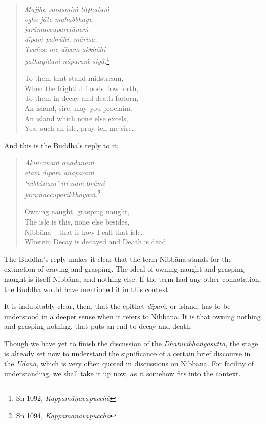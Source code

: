 \begin{quote}
\emph{Majjhe sarasmiṁ tiṭṭhataṁ}\\
\emph{oghe jāte mahabbhaye}\\
\emph{jarāmaccuparetānaṁ}\\
\emph{dīpaṁ pabrūhi, mārisa.}\\
\emph{Tvañca me dīpam akkhāhi}\\
\emph{yathayidaṁ nāparaṁ siyā.}\footnote{Sn 1092, \emph{Kappamāṇavapucchā}}

To them that stand midstream,\\
When the frightful floods flow forth,\\
To them in decay and death forlorn,\\
An island, sire, may you proclaim.\\
An island which none else excels,\\
Yea, such an isle, pray tell me sire.
\end{quote}

\clearpage

And this is the Buddha's reply to it:

\begin{quote}
\emph{Akiñcanaṁ anādānaṁ}\\
\emph{etaṁ dīpaṁ anāparaṁ}\\
\emph{`nibbānam' iti naṁ brūmi}\\
\emph{jarāmaccuparikkhayaṁ.}\footnote{Sn 1094, \emph{Kappamāṇavapucchā}}

Owning naught, grasping naught,\\
The isle is this, none else besides,\\
Nibbāna -- that is how I call that isle,\\
Wherein Decay is decayed and Death is dead.
\end{quote}

The Buddha's reply makes it clear that the term Nibbāna stands for the extinction of craving and grasping. The ideal of owning naught and grasping naught is itself Nibbāna, and nothing else. If the term had any other connotation, the Buddha would have mentioned it in this context.

It is indubitably clear, then, that the epithet \emph{dīpaṁ}, or island, has to be understood in a deeper sense when it refers to Nibbāna. It is that owning nothing and grasping nothing, that puts an end to decay and death.

Though we have yet to finish the discussion of the \emph{Dhātuvibhaṅgasutta}, the stage is already set now to understand the significance of a certain brief discourse in the \emph{Udāna}, which is very often quoted in discussions on Nibbāna. For facility of understanding, we shall take it up now, as it somehow fits into the context.

